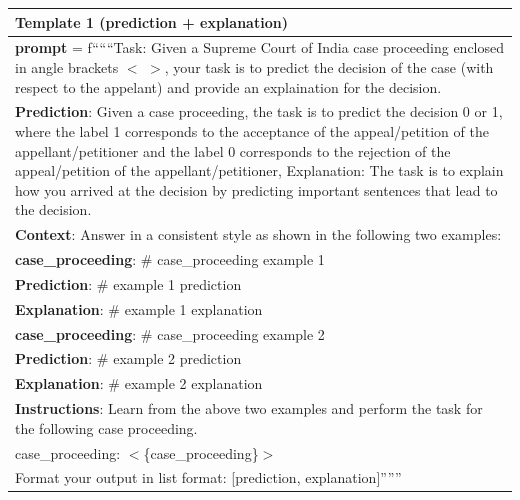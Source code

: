 \begin{table}[ht]
    \centering
    \begin{tabular}{|p{}|}
    \hline
{\bf Template 1 (prediction + explanation)}\\
\hline
   
{\bf prompt} = f``````Task: Given a Supreme Court of India case proceeding enclosed in angle brackets $<$ $>$, your task is to predict the decision of the case (with respect to the appelant) and provide an explaination for the decision.\\


{\bf Prediction}: Given a case proceeding, the task is to predict the decision 0 or 1, where the label 1 corresponds to the acceptance of the appeal/petition of the appellant/petitioner and the label 0 corresponds to the rejection of the appeal/petition of the appellant/petitioner,  Explanation: The task is to explain how you arrived at the decision by predicting important sentences that lead to the decision. \\


{\bf Context}: Answer in a consistent style as shown in the following two examples: \\


  {\bf case\_proceeding}: \# case\_proceeding example 1\\


  {\bf Prediction}: \# example 1 prediction \\


  {\bf Explanation}: \# example 1 explanation\\


  {\bf case\_proceeding}: \# case\_proceeding example 2\\


 {\bf  Prediction}: \# example 2 prediction\\


 {\bf Explanation}: \# example 2 explanation\\


{\bf Instructions}: Learn from the above two examples and perform the task for the following case proceeding. \\


case\_proceeding: $<$\{case\_proceeding\}$>$\\


Format your output in list format: [prediction, explanation]''''''\\


\end{tabular}
\end{table}
